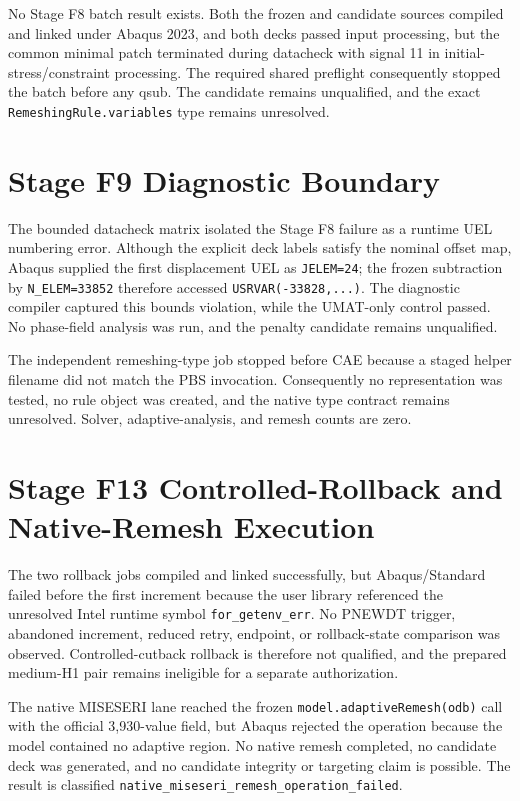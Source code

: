 No Stage F8 batch result exists. Both the frozen and candidate sources
compiled and linked under Abaqus 2023, and both decks passed input
processing, but the common minimal patch terminated during datacheck with
signal 11 in initial-stress/constraint processing. The required shared
preflight consequently stopped the batch before any qsub. The candidate
remains unqualified, and the exact \texttt{RemeshingRule.variables} type
remains unresolved.

\section{Stage F9 Diagnostic Boundary}
The bounded datacheck matrix isolated the Stage F8 failure as a runtime UEL
numbering error.  Although the explicit deck labels satisfy the nominal
offset map, Abaqus supplied the first displacement UEL as
\texttt{JELEM=24}; the frozen subtraction by \texttt{N\_ELEM=33852}
therefore accessed \texttt{USRVAR(-33828,...)}.  The diagnostic compiler
captured this bounds violation, while the UMAT-only control passed.  No
phase-field analysis was run, and the penalty candidate remains unqualified.

The independent remeshing-type job stopped before CAE because a staged helper
filename did not match the PBS invocation.  Consequently no representation
was tested, no rule object was created, and the native type contract remains
unresolved.  Solver, adaptive-analysis, and remesh counts are zero.

\section{Stage F13 Controlled-Rollback and Native-Remesh Execution}

The two rollback jobs compiled and linked successfully, but Abaqus/Standard
failed before the first increment because the user library referenced the
unresolved Intel runtime symbol \texttt{for\_getenv\_err}. No PNEWDT trigger,
abandoned increment, reduced retry, endpoint, or rollback-state comparison was
observed. Controlled-cutback rollback is therefore not qualified, and the
prepared medium-H1 pair remains ineligible for a separate authorization.

The native MISESERI lane reached the frozen
\texttt{model.adaptiveRemesh(odb)} call with the official 3,930-value field,
but Abaqus rejected the operation because the model contained no adaptive
region. No native remesh completed, no candidate deck was generated, and no
candidate integrity or targeting claim is possible. The result is classified
\texttt{native\_miseseri\_remesh\_operation\_failed}.

